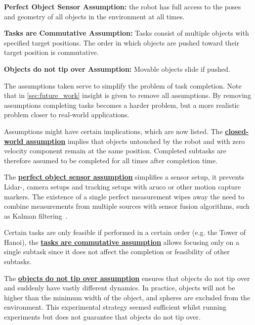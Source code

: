 \begin{assumption*}%
\label{assumption:perfect_object_sensor}
\textbf{Perfect Object Sensor Assumption:} the robot has full access to the poses and geometry of all objects in the environment at all times.
\end{assumption*}\bs

\begin{assumption*}%
\label{assumption:order_does_not_matter}
\textbf{Tasks are Commutative Assumption:} Tasks consist of multiple objects with specified target positions. The order in which objects are pushed toward their target position is commutative.
\end{assumption*}\bs

\begin{assumption*}%
\label{assumption:no_tipping}
\textbf{Objects do not tip over Assumption:} Movable objects slide if pushed.
\end{assumption*}\bs

The assumptions taken serve to simplify the problem of task completion. Note that in \cref{sec:future_work} insight is given to remove all assumptions. By removing assumptions completing tasks becomes a harder problem, but a more realistic problem closer to real-world applications.\bs

Assumptions might have certain implications, which are now listed. The \hyperref[assumption:closed_world]{\textbf{closed-world assumption}} implies that objects untouched by the robot and with zero velocity component remain at the same position. Completed subtasks are therefore assumed to be completed for all times after completion time.\bs

The \hyperref[assumption:perfect_object_sensor]{\textbf{perfect object sensor assumption}} simplifies a sensor setup, it prevents Lidar-, camera setups and tracking setups with aruco or other motion capture markers. The existence of a single perfect measurement wipes away the need to combine measurements from multiple sources with sensor fusion algorithms, such as Kalman filtering~\cite{verhaegen_filtering_2007}.\bs

Certain tasks are only feasible if performed in a certain order (e.g. the Tower of Hanoi), the \hyperref[assumption:order_does_not_matter]{\textbf{tasks are commutative assumption}} allows focusing only on a single subtask since it does not affect the completion or feasibility of other subtasks.\bs

The \hyperref[assumption:no_tipping]{\textbf{objects do not tip over assumption}} ensures that objects do not tip over and suddenly have vastly different dynamics. In practice, objects will not be higher than the minimum width of the object, and spheres are excluded from the environment. This experimental strategy seemed sufficient whilst running experiments but does not guarantee that objects do not tip over.

